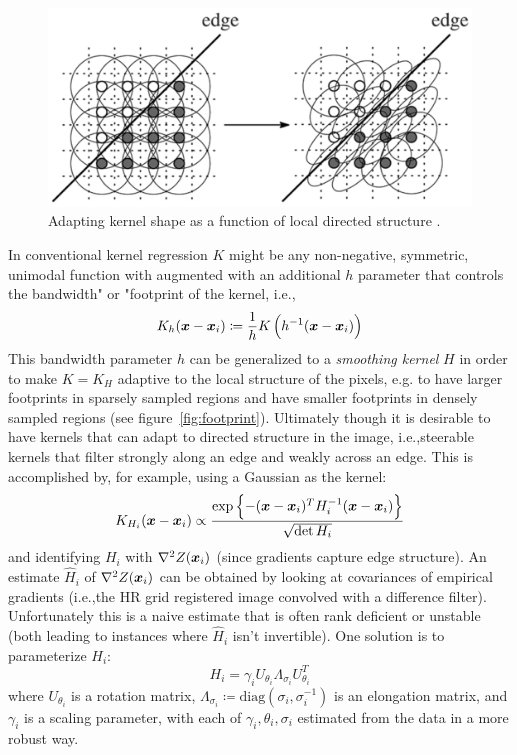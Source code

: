 \begin{figure}
    \centering
    \includegraphics[width=\linewidth,keepaspectratio]{figures/classical/steering.png}
    \caption{Adapting kernel shape as a function of local directed structure \cite{Takeda2007}.}
    \label{fig:steering}
\end{figure}
In conventional kernel regression \(K\) might be any non-negative, symmetric, unimodal \cite{wand1994kernel} function with augmented with an additional \(h\) parameter that controls the bandwidth" or "footprint of the kernel, i.e.,\begin{equation}
    K_h(\bm{x} - \bm{x}_i) \coloneqq \frac{1}{h}K\left( h^{-1}(\bm{x} - \bm{x}_i) \right)
\end{equation}
This bandwidth parameter \(h\) can be generalized to a \textit{smoothing kernel} \(H\) in order to make \(K = K_H\) adaptive to the local structure of the pixels, e.g. to have larger footprints in sparsely sampled regions and have smaller footprints in densely sampled regions (see figure~\ref{fig:footprint}).
%
Ultimately though it is desirable to have kernels that can adapt to directed structure in the image, i.e.,steerable kernels that filter strongly along an edge and weakly across an edge.
%
This is accomplished by, for example, using a Gaussian as the kernel:
\begin{equation}
    K_{H_i}(\bm{x} - \bm{x}_i) \propto \frac{\exp\left\{ -(\bm{x} - \bm{x}_i)^T H^{-1}_i (\bm{x} - \bm{x}_i) \right\}}{\sqrt{\det{H_i}}}
\end{equation}
and identifying \(H_i\) with \(\nabla^2 Z(\bm{x}_i)\) (since gradients capture edge structure).
%
An estimate \(\hat{H}_i\) of \(\nabla^2 Z(\bm{x}_i)\) can be obtained by looking at covariances of empirical gradients (i.e.,the HR grid registered image convolved with a difference filter).
%
Unfortunately this is a naive estimate that is often rank deficient or unstable (both leading to instances where \(\hat{H}_i\) isn't invertible).
%
One solution is to parameterize \(H_i\):
\[
    H_i = \gamma_i U_{\theta_i} \Lambda_{\sigma_i} U_{\theta_i}^T
\]
where \(U_{\theta_i}\) is a rotation matrix, \(\Lambda_{\sigma_i} \coloneqq \text{diag}\left( \sigma_i, \sigma_i^{-1} \right)\) is an elongation matrix, and \(\gamma_i\) is a scaling parameter, with each of \(\gamma_i, \theta_i, \sigma_i\) estimated from the data in a more robust way.
%
